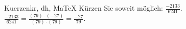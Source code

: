 \begin{MAufgabe}{Kuerzen}{kr, dh, MaTeX}
K\"urzen Sie soweit m\"oglich: $\frac{-2133}{6241}$.\\ 
\ifLsg\MLoesung
\quad $\frac{-2133}{6241}=\frac{(79)\cdot(-27)}{(79)\cdot(79)}=\frac{-27}{79}$.\else\relax\fi
 \end{MAufgabe}
